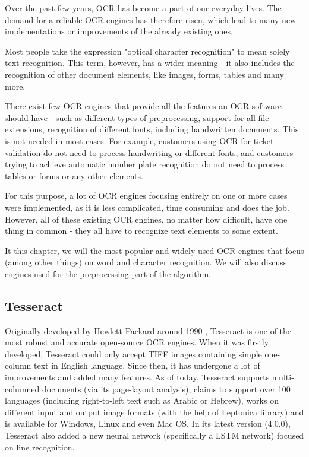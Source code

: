 Over the past few years, OCR has become a part of our everyday lives. The demand for a reliable OCR engines has therefore risen, which lead to many new implementations or improvements of the already existing ones.

Most people take the expression "optical character recognition" to mean solely text recognition. This term, however, has a wider meaning - it also includes the recognition of other document elements, like images, forms, tables and many more.

There exist few OCR engines that provide all the features an OCR software should have - such as different types of preprocessing, support for all file extensions, recognition of different fonts, including handwritten documents. This is not needed in most cases. For example, customers using OCR for ticket validation do not need to process handwriting or different fonts, and customers trying to achieve automatic number plate recognition do not need to process tables or forms or any other elements.

For this purpose, a lot of OCR engines focusing entirely on one or more cases were implemented, as it is less complicated, time consuming and does the job. However, all of these existing OCR engines, no matter how difficult, have one thing in common - they all have to recognize text elements to some extent.

It this chapter, we will  the most popular and widely used OCR engines that focus (among other things) on word and character recognition. We will also discuss engines used for the preprocessing part of the algorithm.

\subsection{Tesseract}

Originally developed by Hewlett-Packard  around 1990 \citep{TesseractGIT}, Tesseract is one of the most robust and accurate open-source OCR engines. When it was firstly developed, Tesseract could only accept TIFF images containing simple one-column text in English language. Since then, it has undergone a lot of improvements and added many features. As of today, Tesseract supports multi-columned documents (via its page-layout analysis), claims to support over 100 languages (including right-to-left text such as Arabic or Hebrew), works on different input and output image formats (with the help of Leptonica \citep{LeptonicaLIB} library) and is available for Windows, Linux and even Mac OS. In its latest version (4.0.0), Tesseract also added a new neural network (specifically a LSTM network) focused on line recognition. 

